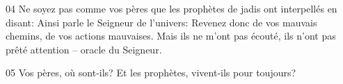 
04 Ne soyez pas comme vos pères que les prophètes de jadis ont interpellés en disant: Ainsi parle le Seigneur de l’univers: Revenez donc de vos mauvais chemins, de vos actions mauvaises. Mais ils ne m’ont pas écouté, ils n’ont pas prêté attention – oracle du Seigneur.

05 Vos pères, où sont-ils? Et les prophètes, vivent-ils pour toujours?
